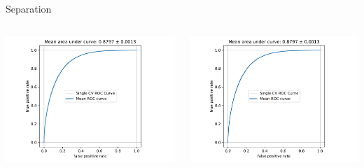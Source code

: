 \begin{frame}[t]{Separation}
\begin{columns}[onlytextwidth]
    \begin{column}{0.475\textwidth}
        \includegraphics[width=1.2\textwidth,page=1]{fig/separation_performance.pdf}
    \end{column}
    \begin{column}{0.475\textwidth}
        \includegraphics[width=\textwidth,page=2]{fig/separation_performance.pdf}
    \end{column}
\end{columns}
\end{frame}

